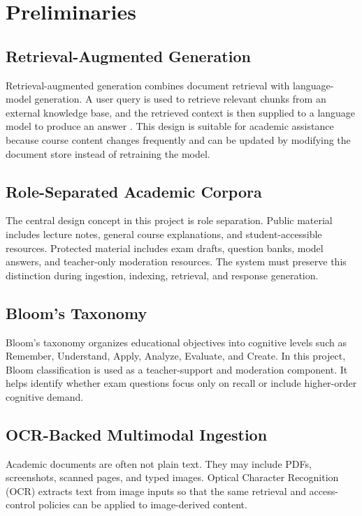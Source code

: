 \section{Preliminaries}

\subsection{Retrieval-Augmented Generation}
Retrieval-augmented generation combines document retrieval with language-model generation. A user query is used to retrieve relevant chunks from an external knowledge base, and the retrieved context is then supplied to a language model to produce an answer \cite{lewis2020rag}. This design is suitable for academic assistance because course content changes frequently and can be updated by modifying the document store instead of retraining the model.

\subsection{Role-Separated Academic Corpora}
The central design concept in this project is role separation. Public material includes lecture notes, general course explanations, and student-accessible resources. Protected material includes exam drafts, question banks, model answers, and teacher-only moderation resources. The system must preserve this distinction during ingestion, indexing, retrieval, and response generation.

\subsection{Bloom's Taxonomy}
Bloom's taxonomy organizes educational objectives into cognitive levels such as Remember, Understand, Apply, Analyze, Evaluate, and Create. In this project, Bloom classification is used as a teacher-support and moderation component. It helps identify whether exam questions focus only on recall or include higher-order cognitive demand.

\subsection{OCR-Backed Multimodal Ingestion}
Academic documents are often not plain text. They may include PDFs, screenshots, scanned pages, and typed images. Optical Character Recognition (OCR) extracts text from image inputs so that the same retrieval and access-control policies can be applied to image-derived content.

